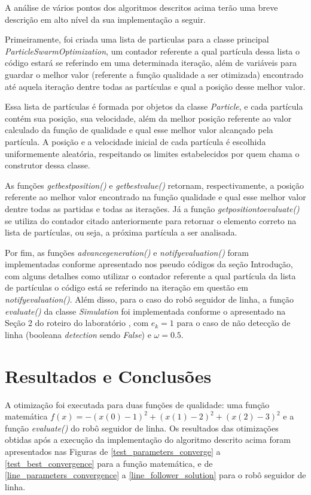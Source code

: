 \documentclass[conference]{IEEEtran}
\begin{document}
A análise de vários pontos dos algoritmos descritos acima terão uma breve descrição em alto nível da sua implementação a seguir. 

Primeiramente, foi criada uma lista de particulas para a classe principal \textit{ParticleSwarmOptimization}, um contador referente a qual partícula dessa lista o código estará se referindo em uma determinada iteração, além de variáveis para guardar o melhor valor (referente a função qualidade a ser otimizada) encontrado até aquela iteração dentre todas as partículas e qual a posição desse melhor valor.

Essa lista de partículas é formada por objetos da classe \textit{Particle}, e cada partícula contém sua posição, sua velocidade, além da melhor posição referente ao valor calculado da função de qualidade e qual esse melhor valor alcançado pela partícula. A posição e a velocidade inicial de cada partícula é escolhida uniformemente aleatória, respeitando os limites estabelecidos por quem chama o construtor dessa classe. 

As funções \textit{get\underline{\space}best\underline{\space}position()} e \textit{get\underline{\space}best\underline{\space}value()} retornam, respectivamente, a posição referente ao melhor valor encontrado na função qualidade e qual esse melhor valor dentre todas as partidas e todas as iterações. Já a função \textit{get\underline{\space}position\underline{\space}to\underline{\space}evaluate()} se utiliza do contador citado anteriormente para retornar o elemento correto na lista de partículas, ou seja, a próxima partícula a ser analisada.

Por fim, as funções \textit{advance\underline{\space}generation()} e \textit{notify\underline{\space}evaluation()} foram implementadas conforme apresentado nos pseudo códigos da seção Introdução, com alguns detalhes como utilizar o contador referente a qual partícula da lista de partículas o código está se referindo na iteração em questão em \textit{notify\underline{\space}evaluation()}. Além disso, para o caso do robô seguidor de linha, a função \textit{evaluate()} da classe \textit{Simulation} foi implementada conforme o apresentado na Seção 2 do roteiro do laboratório \cite{b1}, com $e_k = 1$ para o caso de não detecção de linha (booleana \textit{detection} sendo \textit{False}) e $\omega = 0.5$. 

\section{Resultados e Conclusões}
A otimização foi executada para duas funções de qualidade: uma função matemática $f\left ( x \right ) = - \left ( x\left ( 0 \right ) - 1 \right )^{2} + \left ( x\left ( 1 \right ) - 2 \right )^{2} + \left ( x\left ( 2 \right ) - 3 \right )^{2}$ e a função \textit{evaluate()} do robô seguidor de linha. Os resultados das otimizações obtidas após a execução da implementação do algoritmo descrito acima foram apresentados nas Figuras de \ref{test_parameters_converge} a \ref{test_best_convergence} para a função matemática, e de \ref{line_parameters_convergence} a \ref{line_follower_solution} para o robô seguidor de linha.
\end{document}
